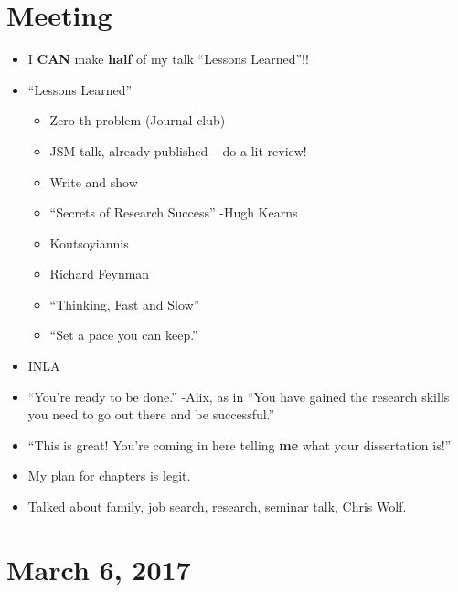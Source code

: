 \documentclass{article}
\begin{document}
\section*{Meeting}
\begin{itemize}
\item I {\bf CAN} make {\bf half} of my talk ``Lessons Learned''!!
\item ``Lessons Learned'' 
  \begin{itemize}
  \item Zero-th problem (Journal club)
  \item JSM talk, already published -- do a lit review!
  \item Write and show
  \item ``Secrets of Research Success'' -Hugh Kearns
  \item Koutsoyiannis
  \item Richard Feynman
  \item ``Thinking, Fast and Slow''
  \item ``Set a pace you can keep.''
  \end{itemize}
\item INLA
\item ``You're ready to be done.'' -Alix, as in ``You have gained the research skills you need to go out there and be successful.''
\item ``This is great! You're coming in here telling {\bf  me} what your dissertation is!''
\item My plan for chapters is legit.
\item Talked about family, job search, research, seminar talk, Chris Wolf.
\end{itemize}

\section*{March 6, 2017}
\end{document}
